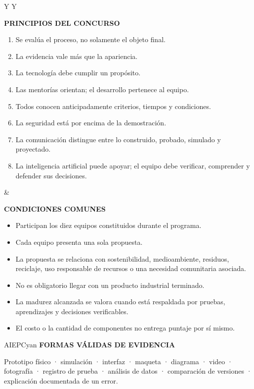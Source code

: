 \documentclass[10pt,a4paper]{article}
\newcommand{\labeltext}[1]{%
  {\scriptsize\bfseries\color{AIEPSlate}\MakeUppercase{#1}}\par\vspace{1.2mm}
}
\begin{document}
\begin{tabularx}{\textwidth}{Y Y}
\begin{card}[height=84mm,valign=top]
\labeltext{Principios del concurso}
\begin{enumerate}
  \item Se evalúa el proceso, no solamente el objeto final.
  \item La evidencia vale más que la apariencia.
  \item La tecnología debe cumplir un propósito.
  \item Las mentorías orientan; el desarrollo pertenece al equipo.
  \item Todos conocen anticipadamente criterios, tiempos y condiciones.
  \item La seguridad está por encima de la demostración.
  \item La comunicación distingue entre lo construido, probado, simulado y proyectado.
  \item La inteligencia artificial puede apoyar; el equipo debe verificar, comprender y defender sus decisiones.
\end{enumerate}
\end{card}
&
\begin{card}[height=84mm,valign=top]
\labeltext{Condiciones comunes}
\begin{itemize}
  \item Participan los diez equipos constituidos durante el programa.
  \item Cada equipo presenta una sola propuesta.
  \item La propuesta se relaciona con sostenibilidad, medioambiente, residuos, reciclaje, uso responsable de recursos o una necesidad comunitaria asociada.
  \item No es obligatorio llegar con un producto industrial terminado.
  \item La madurez alcanzada se valora cuando está respaldada por pruebas, aprendizajes y decisiones verificables.
  \item El costo o la cantidad de componentes no entrega puntaje por sí mismo.
\end{itemize}
\end{card}
\end{tabularx}

\begin{softcard}{AIEPCyan}
\labeltext{Formas válidas de evidencia}
Prototipo físico · simulación · interfaz · maqueta · diagrama · video · fotografía · registro de
prueba · análisis de datos · comparación de versiones · explicación documentada de un error.
\end{softcard}
\end{document}
